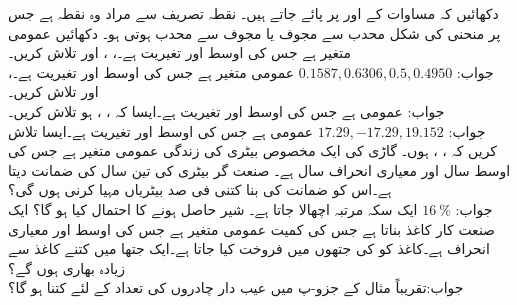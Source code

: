 \quad
دکھائیں کہ مساوات  کے  اور  پر پائے جاتے ہیں۔ نقطہ تصریف سے مراد وہ نقطہ ہے جس پر منحنی کی شکل محدب سے مجوف یا مجوف سے محدب ہوتی ہو۔
\quad
دکھائیں 
\quad
{} عمومی متغیر ہے جس کی اوسط  اور تغیریت  ہے۔، ،  اور  تلاش کریں۔\\
جواب:\quad
$0.1587,0.6306,0.5,0.4950$
\quad
{} عمومی متغیر ہے جس کی اوسط  اور تغیریت  ہے۔،  اور  تلاش کریں۔\\
جواب:\quad
{}
\quad
{} عمومی ہے جس کی اوسط  اور تغیریت  ہے۔ایسا   کہ ، ،  ہو تلاش کریں۔\\
جواب:\quad
$17.29,-17.29,19.152$
\quad
{} عمومی ہے جس کی اوسط  اور تغیریت  ہے۔ایسا  تلاش کریں کہ ،
 ،  ہوں۔
\quad
گاڑی کی ایک مخصوص بیٹری کی زندگی  عمومی متغیر ہے جس کی اوسط  سال اور معیاری انحراف  سال ہے۔ صنعت گر بیٹری کی تین سال کی ضمانت دیتا ہے۔اس کو ضمانت کی بنا کتنی فی صد بیٹریاں مہیا کرنی ہوں گی؟\\
جواب:\quad
$\SI{16}{\percent}$
\quad
ایک سکہ  مرتبہ اچھالا جاتا ہے۔ شیر حاصل ہونے کا احتمال کیا ہو گا؟
\quad
ایک صنعت کار کاغذ بناتا ہے جس کی کمیت عمومی متغیر ہے جس کی اوسط  اور معیاری انحراف  ہے۔کاغذ کو  کی جتھوں میں فروخت کیا جاتا ہے۔ایک جتھا میں کتنے کاغذ  سے زیادہ بھاری ہوں گے؟\\
جواب:\quad تقریباً 
\quad
مثال  کے جزو-پ میں عیب دار چادروں کی تعداد  کے لئے  کتنا ہو گا؟ 
